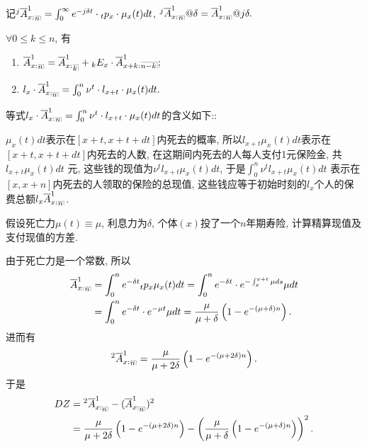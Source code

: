 \documentclass[lang=cn,10pt]{elegantbook}
\makeatletter
\DeclareRobustCommand{\annu}[1]{_{%
    \def\arraystretch{0}%
    \setlength\arraycolsep{1pt}%
    \setlength\arrayrulewidth{.2pt}%
    \begin{array}[b]{@{}c|}\hline
        \\[\arraycolsep]%
        \scriptstyle #1%
    \end{array}%
}}
\makeatother
\begin{document}
\begin{remark}
    记$^j\overline{A}_{x:}^1{}_{\annu{n}}=\int_0^{\infty}{e^{-j\delta t}\cdot {}_tp_x\cdot \mu_{x}(t)dt}$, $^j\overline{A}_{x:}^1{}_{\annu{n}}@\delta=\overline{A}_{x:}^1{}_{\annu{n}}@j\delta.$
\end{remark}

\begin{corollary}[精算现值的性质]
    $\forall 0\leqslant k\leqslant n$, 有
    \begin{enumerate}
        \item $\overline{A}_{x:}^1{}_{{}\annu{n}}=\overline{A}_{x:}^1{}_{\annu k}+{}_kE_x\cdot\overline{A}_{x+k:}^1{}\annu{n-k};$
        \item $l_x\cdot\overline{A}_{x:\annu{n}}^1=\int_0^{n}{\nu^{t}\cdot l_{x+t}\cdot \mu_{x}(t)dt}.$
    \end{enumerate}
\end{corollary}

\begin{remark}
    等式$l_x\cdot\overline{A}_{x:}^1{}_{\annu{n}}=\int_0^{n}{\nu^{t}\cdot l_{x+t}\cdot \mu_{x}(t)dt}$的含义如下::

    $\mu_x(t)dt$表示在$[x+t,x+t+dt]$内死去的概率, 所以$l_{x+t}\mu_x(t)dt$表示在$[x+t,x+t+dt]$内死去的人数, 在这期间内死去的人每人支付1元保险金, 共$l_{x+t}\mu_x(t)dt$ 元, 这些钱的现值为$\nu^t l_{x+t}\mu_x(t)dt$, 于是$\int_0^n{\nu^t l_{x+t}\mu_x(t)dt}$ 表示在$[x,x+n]$内死去的人领取的保险的总现值, 这些钱应等于初始时刻的$l_x$个人的保费总额$l_x\overline{A}_{x:}^1{}_{\annu{n}}$.
\end{remark}

\begin{example}
    假设死亡力$\mu(t) \equiv \mu $, 利息力为$\delta$, 个体$(x)$投了一个$n$年期寿险, 计算精算现值及支付现值的方差.
\end{example}

\begin{solution}
    由于死亡力是一个常数, 所以
    \begin{align*}
        \overline{A}_{x:}^1{}_{\annu{n}} & = \int_0^n{e^{-\delta t}{}_tp_x\mu_x(t)dt}= \int_0^n{e^{-\delta t}\cdot e^{-\int_{x}^{x+t} \mu ds}\mu dt}          \\
                                         & = \int_0^n{e^{-\delta t}\cdot e^{-\mu t}\mu dt} = \frac{\mu}{\mu + \delta} \left(1 - e^{-(\mu + \delta)n} \right).
    \end{align*}
    进而有
    \begin{align*}
        ^2\overline{A}_{x:}^1{}_{\annu{n}}= \frac{\mu}{\mu + 2\delta} \left(1 - e^{-(\mu + 2\delta)n} \right).
    \end{align*}
    于是
    \begin{align*}
        DZ & = {}^2\overline{A}_{x:\annu{n}}^1 - (\overline{A}_{x:\annu{n}}^1)^2                                                                                   \\
           & = \frac{\mu}{\mu + 2\delta} \left(1 - e^{-(\mu + 2\delta)n} \right) - \left(\frac{\mu}{\mu + \delta} \left(1 - e^{-(\mu + \delta)n} \right)\right)^2.
    \end{align*}
\end{solution}
\end{document}
